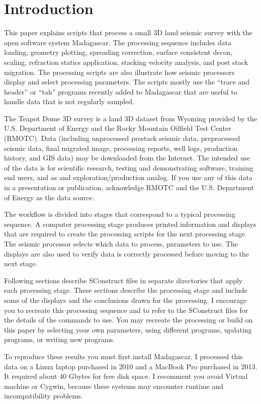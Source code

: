 \section{Introduction}
This paper explains scripts that process a small 3D land seismic survey with the open software system Madagascar.  The processing sequence includes data loading, geometry plotting, spreading correction, surface consistent decon, scaling, refraction statics application, stacking velocity analysis, and post stack migration.  The processing scripts are also illustrate how seismic processors display and select processing parameters.  The scripts mostly use the “trace and header” or “tah” programs recently added to Madagascar that are useful to handle data that is not regularly sampled. 

The Teapot Dome 3D survey is a land 3D dataset from Wyoming provided by the U.S. Department of Energy and the Rocky Mountain Oilfield Test Center (RMOTC).  Data (including unprocessed prestack seismic data, preprocessed seismic data, final migrated image, processing reports, well logs, production history, and GIS data) may be downloaded from the Internet.    The intended use of the data is for scientific research, testing and demonstrating software, training end users, and as and exploration/production analog.  If you use any of this data in a presentation or publication, acknowledge RMOTC and the U.S. Department of Energy as the data source.

The workflow is divided into stages that correspond to a typical processing sequence.  A computer processing stage produces printed information and displays that are required to create the processing scripts for the next processing stage.  The seismic processor selects which data to process, parameters to use.  The displays are also used to verify data is correctly processed before moving to the next stage.

Following sections describe SConstruct files in separate directories that apply each processing stage.  These sections describe the processing stage and include some of the displays and the conclusions drawn for the processing.  I encourage you to recreate this processing sequence and to refer to the SConstruct files for the details of the commands to use.  You may recreate the processing or build on this paper by selecting your own parameters, using different programs, updating programs, or writing new programs.  

To reproduce these results you must first install Madagascar.  I processed this data on a Linux laptop purchased in 2010 and a MacBook Pro purchased in 2013.  It required about 40 Gbytes for free disk space.  I recomment you avoid Virtual machine or Cygwin, because these systems may encounter runtime and incompatibility problems.  

